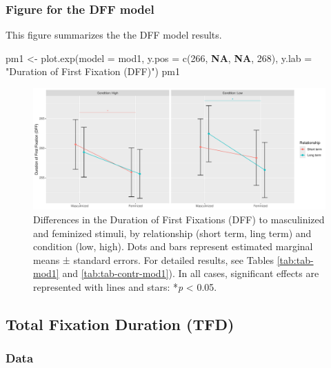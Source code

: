 \documentclass[
  bookmarksnumbered]{article}
\newenvironment{Shaded}{\begin{snugshade}}{\end{snugshade}}
\newcommand{\AttributeTok}[1]{\textcolor[rgb]{0.80,0.80,0.80}{#1}}
\newcommand{\ConstantTok}[1]{\textcolor[rgb]{0.86,0.64,0.64}{\textbf{#1}}}
\newcommand{\DecValTok}[1]{\textcolor[rgb]{0.86,0.86,0.80}{#1}}
\newcommand{\FunctionTok}[1]{\textcolor[rgb]{0.94,0.94,0.56}{#1}}
\newcommand{\NormalTok}[1]{\textcolor[rgb]{0.80,0.80,0.80}{#1}}
\newcommand{\OtherTok}[1]{\textcolor[rgb]{0.94,0.94,0.56}{#1}}
\newcommand{\StringTok}[1]{\textcolor[rgb]{0.80,0.58,0.58}{#1}}
\begin{document}
\subsubsection{Figure for the DFF model}\label{figure-for-the-dff-model}

This figure summarizes the the DFF model results.

\begin{Shaded}
\begin{Highlighting}[]
\NormalTok{pm1 }\OtherTok{\textless{}{-}} \FunctionTok{plot.exp}\NormalTok{(}\AttributeTok{model =}\NormalTok{ mod1, }
                \AttributeTok{y.pos =} \FunctionTok{c}\NormalTok{(}\DecValTok{266}\NormalTok{, }\ConstantTok{NA}\NormalTok{, }\ConstantTok{NA}\NormalTok{, }\DecValTok{268}\NormalTok{),}
                \AttributeTok{y.lab =} \StringTok{"Duration of First Fixation (DFF)"}\NormalTok{)}
\NormalTok{pm1}
\end{Highlighting}
\end{Shaded}

\begin{figure}
\centering
\includegraphics{Supplementary_material_files/figure-latex/fig-mod1-1.pdf}
\caption{\label{fig:fig-mod1}Differences in the Duration of First Fixations (DFF) to masculinized and feminized stimuli, by relationship (short term, ling term) and condition (low, high). Dots and bars represent estimated marginal means ± standard errors. For detailed results, see Tables \ref{tab:tab-mod1} and \ref{tab:tab-contr-mod1}). In all cases, significant effects are represented with lines and stars: *\emph{p} \textless{} 0.05.}
\end{figure}

\subsection{Total Fixation Duration (TFD)}\label{total-fixation-duration-tfd}

\subsubsection{Data}\label{data-1}
\end{document}
